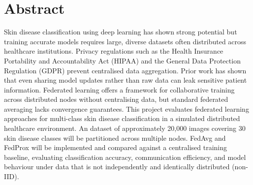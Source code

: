 \documentclass[12pt,openany,a4paper]{book}
\begin{document}
\chapter{Abstract}


Skin disease classification using deep learning has shown strong potential but training accurate models requires large, diverse datasets often distributed across healthcare institutions. Privacy regulations such as the Health Insurance Portability and Accountability Act (HIPAA) and the General Data Protection Regulation (GDPR) prevent centralised data aggregation. Prior work has shown that even sharing model updates rather than raw data can leak sensitive patient information. Federated learning offers a framework for collaborative training across distributed nodes without centralising data, but standard federated averaging lacks convergence guarantees. This project evaluates federated learning approaches for multi-class skin disease classification in a simulated distributed healthcare environment. An dataset of approximately 20,000 images covering 30 skin disease classes will be partitioned across multiple nodes. FedAvg and FedProx will be implemented and compared against a centralised training baseline, evaluating classification accuracy, communication efficiency, and model behaviour under data that is not independently and identically distributed (non-IID).

\tableofcontents

\listoffigures
{}

\listoftables
{}

% 

\cleardoublepage

\mainmatter


%
%
%
%	
%	
\end{document}
